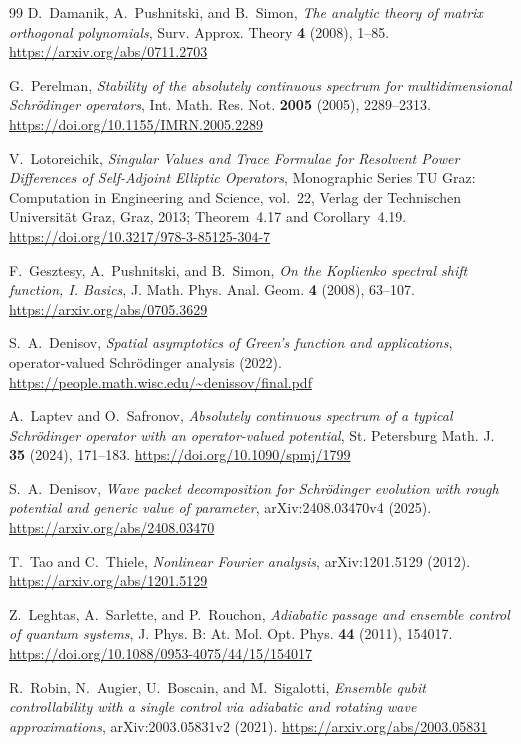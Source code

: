 \documentclass[11pt]{article}
\theoremstyle{definition}
\theoremstyle{remark}
\begin{document}
\begin{thebibliography}{99}
D.~Damanik, A.~Pushnitski, and B.~Simon,
\emph{The analytic theory of matrix orthogonal polynomials},
Surv. Approx. Theory \textbf{4} (2008), 1--85.
\url{https://arxiv.org/abs/0711.2703}

G.~Perelman,
\emph{Stability of the absolutely continuous spectrum for multidimensional Schr\"odinger operators},
Int. Math. Res. Not. \textbf{2005} (2005), 2289--2313.
\url{https://doi.org/10.1155/IMRN.2005.2289}

V.~Lotoreichik,
\emph{Singular Values and Trace Formulae for Resolvent Power Differences of Self-Adjoint Elliptic Operators},
Monographic Series TU Graz: Computation in Engineering and Science, vol.~22,
Verlag der Technischen Universit\"at Graz, Graz, 2013; Theorem~4.17 and Corollary~4.19.
\url{https://doi.org/10.3217/978-3-85125-304-7}

F.~Gesztesy, A.~Pushnitski, and B.~Simon,
\emph{On the Koplienko spectral shift function, I. Basics},
J. Math. Phys. Anal. Geom. \textbf{4} (2008), 63--107.
\url{https://arxiv.org/abs/0705.3629}

S.~A.~Denisov,
\emph{Spatial asymptotics of Green's function and applications},
operator-valued Schr\"odinger analysis (2022).
\url{https://people.math.wisc.edu/~denissov/final.pdf}

A.~Laptev and O.~Safronov,
\emph{Absolutely continuous spectrum of a typical Schr\"odinger operator with an operator-valued potential},
St. Petersburg Math. J. \textbf{35} (2024), 171--183.
\url{https://doi.org/10.1090/spmj/1799}

S.~A.~Denisov,
\emph{Wave packet decomposition for Schr\"odinger evolution with rough potential and generic value of parameter},
arXiv:2408.03470v4 (2025).
\url{https://arxiv.org/abs/2408.03470}

T.~Tao and C.~Thiele,
\emph{Nonlinear Fourier analysis},
arXiv:1201.5129 (2012).
\url{https://arxiv.org/abs/1201.5129}

Z.~Leghtas, A.~Sarlette, and P.~Rouchon,
\emph{Adiabatic passage and ensemble control of quantum systems},
J. Phys. B: At. Mol. Opt. Phys. \textbf{44} (2011), 154017.
\url{https://doi.org/10.1088/0953-4075/44/15/154017}

R.~Robin, N.~Augier, U.~Boscain, and M.~Sigalotti,
\emph{Ensemble qubit controllability with a single control via adiabatic and rotating wave approximations},
arXiv:2003.05831v2 (2021).
\url{https://arxiv.org/abs/2003.05831}


\end{thebibliography}
\end{document}
